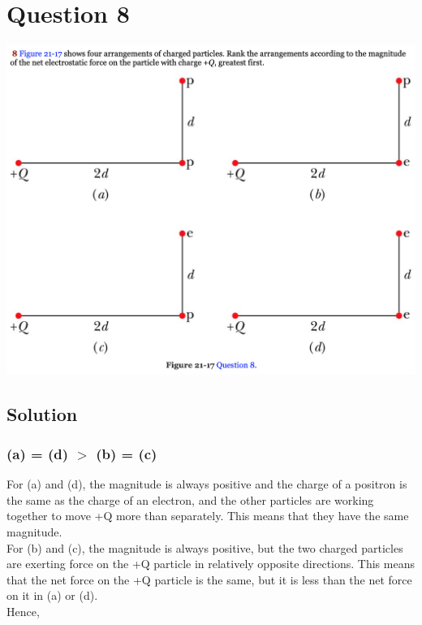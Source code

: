 \documentclass[12pt]{article}
\begin{document}
\section*{Question 8}
    \includegraphics[width=\textwidth]{picture_2.png} 

\subsection*{Solution}
\subsubsection*{(a) = (d) $>$ (b) = (c)}
For (a) and (d), the magnitude is always positive and the charge of a positron is the same as the charge of an electron, and the other particles are working together to move +Q more than separately. This means that they have the same magnitude.\\
For (b) and (c), the magnitude is always positive, but the two charged particles are exerting force on the +Q particle in relatively opposite directions. This means that the net force on the +Q particle is the same, but it is less than the net force on it in (a) or (d).\\
Hence, 


\pagebreak
\end{document}
